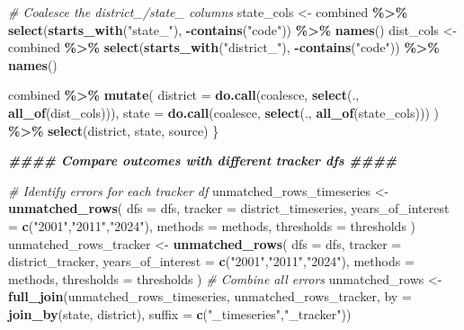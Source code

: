 \documentclass[
]{article}
\newenvironment{Shaded}{\begin{snugshade}}{\end{snugshade}}
\newcommand{\AttributeTok}[1]{\textcolor[rgb]{0.13,0.29,0.53}{#1}}
\newcommand{\CommentTok}[1]{\textcolor[rgb]{0.56,0.35,0.01}{\textit{#1}}}
\newcommand{\DocumentationTok}[1]{\textcolor[rgb]{0.56,0.35,0.01}{\textbf{\textit{#1}}}}
\newcommand{\FunctionTok}[1]{\textcolor[rgb]{0.13,0.29,0.53}{\textbf{#1}}}
\newcommand{\NormalTok}[1]{#1}
\newcommand{\OtherTok}[1]{\textcolor[rgb]{0.56,0.35,0.01}{#1}}
\newcommand{\SpecialCharTok}[1]{\textcolor[rgb]{0.81,0.36,0.00}{\textbf{#1}}}
\newcommand{\StringTok}[1]{\textcolor[rgb]{0.31,0.60,0.02}{#1}}
\begin{document}
\begin{Shaded}
\begin{Highlighting}[]
  \CommentTok{\# Coalesce the district\_/state\_ columns}
\NormalTok{  state\_cols }\OtherTok{\textless{}{-}}\NormalTok{ combined }\SpecialCharTok{\%\textgreater{}\%}
    \FunctionTok{select}\NormalTok{(}\FunctionTok{starts\_with}\NormalTok{(}\StringTok{"state\_"}\NormalTok{), }\SpecialCharTok{{-}}\FunctionTok{contains}\NormalTok{(}\StringTok{"code"}\NormalTok{)) }\SpecialCharTok{\%\textgreater{}\%}
    \FunctionTok{names}\NormalTok{()}
\NormalTok{  dist\_cols }\OtherTok{\textless{}{-}}\NormalTok{ combined }\SpecialCharTok{\%\textgreater{}\%}
    \FunctionTok{select}\NormalTok{(}\FunctionTok{starts\_with}\NormalTok{(}\StringTok{"district\_"}\NormalTok{), }\SpecialCharTok{{-}}\FunctionTok{contains}\NormalTok{(}\StringTok{"code"}\NormalTok{)) }\SpecialCharTok{\%\textgreater{}\%}
    \FunctionTok{names}\NormalTok{()}
  
\NormalTok{  combined }\SpecialCharTok{\%\textgreater{}\%}
    \FunctionTok{mutate}\NormalTok{(}
      \AttributeTok{district =} \FunctionTok{do.call}\NormalTok{(coalesce, }\FunctionTok{select}\NormalTok{(., }\FunctionTok{all\_of}\NormalTok{(dist\_cols))),}
      \AttributeTok{state =} \FunctionTok{do.call}\NormalTok{(coalesce, }\FunctionTok{select}\NormalTok{(., }\FunctionTok{all\_of}\NormalTok{(state\_cols)))}
\NormalTok{    ) }\SpecialCharTok{\%\textgreater{}\%}
    \FunctionTok{select}\NormalTok{(district, state, source)}
\NormalTok{\}}





\DocumentationTok{\#\#\#\# Compare outcomes with different tracker dfs \#\#\#\#}

\CommentTok{\# Identify errors for each tracker df}
\NormalTok{unmatched\_rows\_timeseries }\OtherTok{\textless{}{-}} \FunctionTok{unmatched\_rows}\NormalTok{(}
  \AttributeTok{dfs =}\NormalTok{ dfs, }\AttributeTok{tracker =}\NormalTok{ district\_timeseries,}
  \AttributeTok{years\_of\_interest =} \FunctionTok{c}\NormalTok{(}\StringTok{"2001"}\NormalTok{,}\StringTok{"2011"}\NormalTok{,}\StringTok{"2024"}\NormalTok{),}
  \AttributeTok{methods =}\NormalTok{ methods, }\AttributeTok{thresholds =}\NormalTok{ thresholds}
\NormalTok{)}
\NormalTok{unmatched\_rows\_tracker }\OtherTok{\textless{}{-}} \FunctionTok{unmatched\_rows}\NormalTok{(}
  \AttributeTok{dfs =}\NormalTok{ dfs, }\AttributeTok{tracker =}\NormalTok{ district\_tracker,}
  \AttributeTok{years\_of\_interest =} \FunctionTok{c}\NormalTok{(}\StringTok{"2001"}\NormalTok{,}\StringTok{"2011"}\NormalTok{,}\StringTok{"2024"}\NormalTok{),}
  \AttributeTok{methods =}\NormalTok{ methods, }\AttributeTok{thresholds =}\NormalTok{ thresholds}
\NormalTok{)}
\CommentTok{\# Combine all errors}
\NormalTok{unmatched\_rows }\OtherTok{\textless{}{-}} \FunctionTok{full\_join}\NormalTok{(unmatched\_rows\_timeseries, unmatched\_rows\_tracker, }\AttributeTok{by =} \FunctionTok{join\_by}\NormalTok{(state, district), }\AttributeTok{suffix =} \FunctionTok{c}\NormalTok{(}\StringTok{"\_timeseries"}\NormalTok{,}\StringTok{"\_tracker"}\NormalTok{))}



\end{Highlighting}
\end{Shaded}
\end{document}
